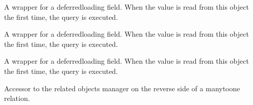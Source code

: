 \documentclass[letterpaper,10pt,english]{sphinxmanual}
\begin{document}
\begin{fulllineitems}
\begin{fulllineitems}
\end{fulllineitems}


\begin{fulllineitems}
\label{\detokenize{users:users.models.CustomUser.is_superuser}}
\pysigstartsignatures
\pysigline
{}
\pysigstopsignatures
\sphinxAtStartPar
A wrapper for a deferred\sphinxhyphen{}loading field. When the value is read from this
object the first time, the query is executed.

\end{fulllineitems}


\begin{fulllineitems}
\label{\detokenize{users:users.models.CustomUser.last_login}}
\pysigstartsignatures
\pysigline
{}
\pysigstopsignatures
\sphinxAtStartPar
A wrapper for a deferred\sphinxhyphen{}loading field. When the value is read from this
object the first time, the query is executed.

\end{fulllineitems}


\begin{fulllineitems}
\label{\detokenize{users:users.models.CustomUser.last_name}}
\pysigstartsignatures
\pysigline
{}
\pysigstopsignatures
\sphinxAtStartPar
A wrapper for a deferred\sphinxhyphen{}loading field. When the value is read from this
object the first time, the query is executed.

\end{fulllineitems}


\begin{fulllineitems}
\label{\detokenize{users:users.models.CustomUser.lesson_created_by}}
\pysigstartsignatures
\pysigline
{}
\pysigstopsignatures
\sphinxAtStartPar
Accessor to the related objects manager on the reverse side of a
many\sphinxhyphen{}to\sphinxhyphen{}one relation.


\end{fulllineitems}
\end{fulllineitems}
\end{document}
